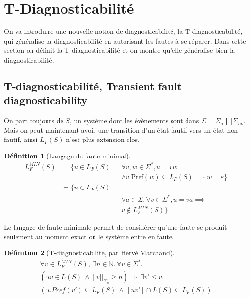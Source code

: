 \documentclass[conference]{IEEEtran}
\newtheorem{mydef}{D\'efinition}
\begin{document}
\section{T-Diagnosticabilité}

On va introduire une nouvelle notion de diagnosticabilité, la T-diagnosticabilité,  qui généralise la diagnosticabilité en autorisant les fautes à se réparer. Dans cette section on définit la T-diagnosticabilité et on montre qu'elle généralise bien la diagnosticabilité.

\subsection{T-diagnosticabilité, Transient fault diagnosticability}
On part toujours de $S$, un système dont les évènements sont dans $\Sigma = \Sigma_o \ \bigsqcup \Sigma_{no}$. Mais on peut maintenant avoir une transition d'un état fautif vers un état non fautif, ainsi $L_F(S)$ n'est plus extension clos.

\begin{mydef}[Langage de faute minimal]
$$\begin{array}{lll}
L_{F}^{MIN}(S)&=\{u \in L_F(S) \mid & \forall v,w \in \Sigma^*, u = vw \\
&&\land v.\text{Pref}(w)\subseteq L_F(S) \implies w = \varepsilon \}\\
 & = \{u \in L_F(S) \mid \\
 &&\forall a \in \Sigma, \forall v \in \Sigma^*, u = va \implies\\
 && v \not \in L_F^{MIN}(S)\}
\end{array}$$
\end{mydef}

Le langage de faute minimale permet de considérer qu'une faute se produit seulement au moment exact où le système entre en faute.

\begin{mydef}[T-diagnosticabilité, par Hervé Marchand]

$$\begin{array}{l}
\forall u \in L^{MIN}_F(S),\ \exists n \in \mathbb{N}, \forall v \in \Sigma^*.\\
(uv \in L(S) \ \wedge \  ||v||_{\Sigma_o}\geq n) \Rightarrow \ \exists v' \leq v. \\
(u.Pref(v') \subseteq L_F(S) \ \wedge \  [uv'] \cap L(S) \subseteq L_F(S))
\end{array}$$
\end{mydef}
\end{document}

